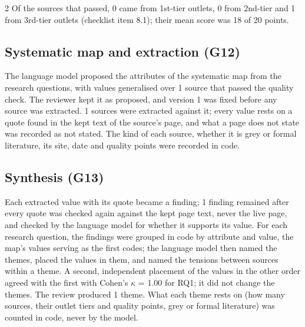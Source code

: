\documentclass[10pt,a4paper]{article}
\begin{document}
\begin{multicols}{2}
Of the sources that passed, 0 came from 1st-tier outlets, 0 from 2nd-tier and 1 from 3rd-tier outlets (checklist item 8.1); their mean score was 18 of 20 points.

\subsection{Systematic map and extraction (G12)}\label{sec:systematic-map-and-extraction-g12}

The language model proposed the attributes of the systematic map from the research questions, with values generalised over 1 source that passed the quality check.
The reviewer kept it as proposed, and version 1 was fixed before any source was extracted. 1 sources were extracted against it; every value rests on a quote found in the kept text of the source's page, and what a page does not state was recorded as not stated.
The kind of each source, whether it is grey or formal literature, its site, date and quality points were recorded in code.

\par\smallskip{}\par\smallskip

\subsection{Synthesis (G13)}\label{sec:synthesis-g13}

Each extracted value with its quote became a finding; 1 finding remained after every quote was checked again against the kept page text, never the live page, and checked by the language model for whether it supports its value.
For each research question, the findings were grouped in code by attribute and value, the map's values serving as the first codes; the language model then named the themes, placed the values in them, and named the tensions between sources within a theme.
A second, independent placement of the values in the other order agreed with the first with Cohen's $\kappa$ = 1.00 for RQ1; it did not change the themes.
The review produced 1 theme.
What each theme rests on (how many sources, their outlet tiers and quality points, grey or formal literature) was counted in code, never by the model.

\end{multicols}
\end{document}
